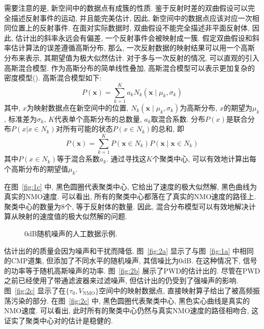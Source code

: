 需要注意的是, 新空间中的数据点有成簇的性质. 鉴于反射时差的双曲假设可以完全描述反射事件的运动, 并且能完美估计, 因此, 新空间中的数据点应该对应一次相同位置上的反射事件. 在面对实际数据时, 双曲假设不能完全描述非平面反射体, 因此, 估计出的斜率永远会有偏差, 一个反射事件会被映射成一簇. 假定双曲假设和斜率估计算法的误差遵循高斯分布, 那么, 一次反射数据的映射结果可以用一个高斯分布来表示, 其期望值为极大似然估计. 对于多与一次反射的情况, 可以直观的引入高斯混合模型. 作为高斯分布的简单线性叠加, 高斯混合模型可以表示更加复杂的密度模型(\cite{Bishop2006}). 高斯混合模型如下: 
\begin{equation}
    P(\mathbf{x})=\sum_{k=1}^{K} a_{k} N_{k}\left(\mathbf{x} \mid \mu_{k}, \sigma_{k}\right)
\end{equation}
其中, $x$为映射数据点在新空间中的位置, $N_{k}\left(\mathbf{x} \mid \mu_{k}, \sigma_{k}\right)$为高斯分布, $x$的期望为$\mu_k$, 标准差为$\sigma_k$, $K$代表单个高斯分布的总数量, $a_k$取混合系数. 分布$P(x)$是联合分布$P(x|x\in N_k)$对所有可能的状态$P(x\in N_k)$的总和, 即
\begin{equation}
    P(\mathbf{x})=\sum_{k=1}^{K} P\left(\mathbf{x} \in N_{k}\right) P\left(\mathbf{x} \mid \mathbf{x} \in N_{k}\right)
\end{equation}
其中$P(x\in N_k)$等于混合系数$a_k$. 通过寻找这$K$个聚类中心, 可以有效地计算出每个高斯分布的期望值$\mu_k$. 

在图~\ref{fig:1c} 中, 黑色圆圈代表聚类中心, 它给出了速度的极大似然解, 黑色曲线为真实的NMO速度. 可以看出, 所有的聚类中心都落在了真实的NMO速度的路径上. 聚类中心的数量为8个, 等于反射体的数量. 因此, 混合分布模型可以有效地解决计算从映射的速度值的极大似然解的问题. 
\begin{figure}[htb]
    \centering
    \caption{0dB随机噪声的人工数据示例. }
\end{figure}

估计出的的质量会因为噪声和干扰而降低. 图~\ref{fig:2a} 显示了与图~\ref{fig:1a} 中相同的CMP道集, 但添加了不同水平的随机噪声, 其信噪比为0dB. 在这种情况下, 信号的功率等于随机高斯噪声的功率. 图~\ref{fig:2b} 展示了PWD的估计出的. 尽管在PWD之前已经使用了带通滤波器来过滤噪声, 但估计出的仍受到了强噪声的影响. 图~\ref{fig:2c} 显示了在$\{\tau_0,V_{\mathrm{NMO}}\}$空间中的映射数据点, 直接映射算子给出了被高频振荡污染的部分. 在图~\ref{fig:2c} 中, 黑色圆圈代表聚类中心, 黑色实心曲线是真实的NMO速度. 可以看出, 此时所有的聚类中心仍然与真实NMO速度的路径相吻合, 这证实了聚类中心对的估计是稳健的. 
